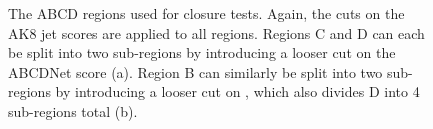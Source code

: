 \begin{figure}[htb]
    \centering
    \qquad
    \caption[The ABCD regions used for closure tests]{
        The ABCD regions used for closure tests. 
        Again, the cuts on the AK8 jet \ParticleNet scores are applied to all regions. 
        Regions C and D can each be split into two sub-regions by introducing a looser cut on the ABCDNet score (a). 
        Region B can similarly be split into two sub-regions by introducing a looser cut on \detajj, which also divides D into 4 sub-regions total (b).
    }
    \label{fig:vbsvvh_abcd_extra}
\end{figure}

